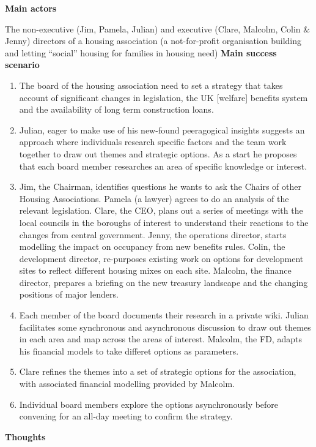 \textbf{Main actors}

The non-executive (Jim, Pamela, Julian) and executive (Clare, Malcolm,
Colin \& Jenny) directors of a housing association (a not-for-profit
organisation building and letting ``social'' housing for families in
housing need) \textbf{Main success scenario}

\begin{enumerate}
\item
  The board of the housing association need to set a strategy that takes
  account of significant changes in legislation, the UK {[}welfare{]}
  benefits system and the availability of long term construction loans.
\item
  Julian, eager to make use of his new-found peeragogical insights
  suggests an approach where individuals research specific factors and
  the team work together to draw out themes and strategic options. As a
  start he proposes that each board member researches an area of
  specific knowledge or interest.
\item
  Jim, the Chairman, identifies questions he wants to ask the Chairs of
  other Housing Associations. Pamela (a lawyer) agrees to do an analysis
  of the relevant legislation. Clare, the CEO, plans out a series of
  meetings with the local councils in the boroughs of interest to
  understand their reactions to the changes from central government.
  Jenny, the operations director, starts modelling the impact on
  occupancy from new benefits rules. Colin, the development director,
  re-purposes existing work on options for development sites to reflect
  different housing mixes on each site. Malcolm, the finance director,
  prepares a briefing on the new treasury landscape and the changing
  positions of major lenders.
\item
  Each member of the board documents their research in a private wiki.
  Julian facilitates some synchronous and asynchronous discussion to
  draw out themes in each area and map across the areas of interest.
  Malcolm, the FD, adapts his financial models to take differet options
  as parameters.
\item
  Clare refines the themes into a set of strategic options for the
  association, with associated financial modelling provided by Malcolm.
\item
  Individual board members explore the options asynchronously before
  convening for an all-day meeting to confirm the strategy.
\end{enumerate}
\textbf{Thoughts}

